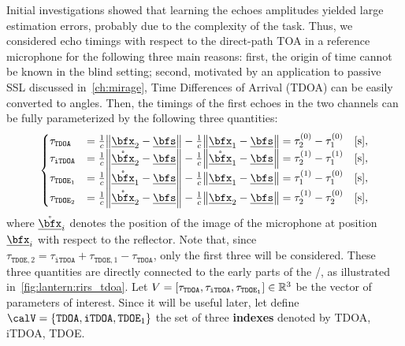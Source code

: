 \newcommand{\setTDOA}{\ensuremath{\set{\mathtt{TDOA}, \mathtt{iTDOA}, {\mathtt{TDOE}_1}}}}
\mynewline
Initial investigations showed that learning the echoes amplitudes yielded large estimation errors, probably due to the complexity of the task.
Thus, we considered echo timings with respect to the direct-path \ac{TOA} in a reference microphone for the following three main reasons:
first, the origin of time cannot be known in the blind setting;
second, motivated by an application to passive \ac{SSL} discussed in~\cref{ch:mirage}, Time Differences of Arrival (\acs{TDOA}) can be easily converted to angles.
Then, the timings of the first echoes in the two channels can be fully parameterized by the following three quantities:
\begin{equation}
    \begin{cases}
        \tau_\mathtt{TDOA}  &= \tfrac{1}{c} \norm{\positionMicrophone_2 - \positionSource} - \tfrac{1}{c} \norm{\positionMicrophone_1 - \positionSource} = \tau_2^{(0)} - \tau_1^{(0)} \quad[\text{s}],\\
        \tau_\mathtt{iTDOA} &= \tfrac{1}{c} \norm{\mathring{\positionMicrophone}_2 - \positionSource} - \tfrac{1}{c} \norm{\mathring{\positionMicrophone}_1 - \positionSource} = \tau_2^{(1)} - \tau_1^{(1)} \quad[\text{s}],\\
        \tau_{\mathtt{TDOE}_1}  &= \tfrac{1}{c} \norm{\mathring{\positionMicrophone}_1 - \positionSource} - \tfrac{1}{c} \norm{\positionMicrophone_1 - \positionSource} = \tau_1^{(1)} - \tau_1^{(0)} \quad[\text{s}],\\
        \tau_{\mathtt{TDOE}_2}  &= \tfrac{1}{c} \norm{\mathring{\positionMicrophone}_2 - \positionSource} - \tfrac{1}{c} \norm{\positionMicrophone_2 - \positionSource} = \tau_2^{(1)} - \tau_2^{(0)} \quad[\text{s}],
    \end{cases}
\end{equation}
where $\mathring{\positionMicrophone}_i$ denotes the position of the image of the microphone at position $\positionMicrophone_i$ with respect to the reflector.
Note that, since $\tau_{\mathtt{TDOE},2} = \tau_\mathtt{iTDOA} + \tau_{\mathtt{TDOE}, 1} - \tau_\mathtt{TDOA}$, only the first three will be considered.
These three quantities are directly connected to the early parts of the \RIRs/, as illustrated in~\cref{fig:lantern:rirs_tdoa}. Let $V = \klist{\tau_{\mathtt{TDOA}}, \tau_{\mathtt{iTDOA}}, \tau_{\mathtt{TDOE}_1}}\in\mathbb{R}^3$ be the vector of parameters of interest.
Since it will be useful later, let define $\calV = \setTDOA$ the set of three \textbf{indexes} denoted by \ac{TDOA}, \ac{iTDOA}, \ac{TDOE}.

